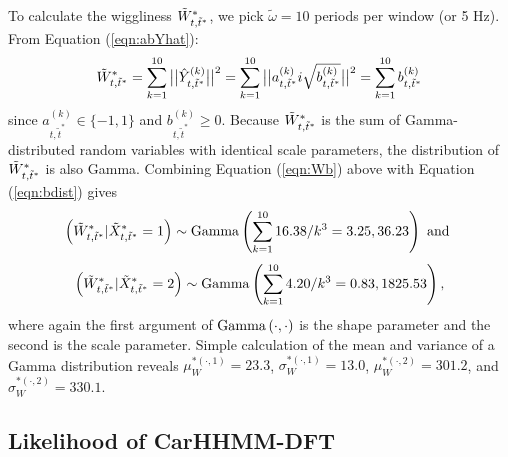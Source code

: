 To calculate the wiggliness $\tilde{W}^*_{t,\tilde t^*}$, we pick $\tilde{\omega} = 10$ periods per window (or 5 Hz). From Equation (\ref{eqn:abYhat}):
%
\begin{equation}
    \Ztwo_{t,\tilde t^*} = \sum_{k=1}^{10} \big|\big|\hat{Y}^{(k)}_{t,\tilde t^*}\big|\big|^2 = \sum_{k=1}^{10} \big|\big|a^{(k)}_{t,\tilde t^*}i\sqrt{b^{(k)}_{t,\tilde t^*}}\big|\big|^2 = \sum_{k=1}^{10} b^{(k)}_{t,\tilde t^*}
    \label{eqn:Wb}
\end{equation}
%
since $a^{(k)}_{t,\tilde t^*} \in \{-1,1\}$ and $b^{(k)}_{t,\tilde t^*} \geq 0$. Because $\tilde{W}^*_{t,\tilde t^*}$ is the sum of Gamma-distributed random variables with identical scale parameters, the distribution of $\tilde{W}^*_{t,\tilde t^*}$ is also Gamma. Combining Equation (\ref{eqn:Wb}) above with Equation (\ref{eqn:bdist}) gives
%
$$\left(\tilde{W}^*_{t,\tilde t^*}|\tilde X^*_{t,\tilde t^*} = 1\right) \sim {\rm{Gamma}}\left(\sum_{k=1}^{10} 16.38/k^3 = 3.25 , 36.23 \right) \text { and }$$
%
$$\left(\tilde{W}^*_{t,\tilde t^*}|\tilde X^*_{t,\tilde t^*} = 2\right) \sim {\rm{Gamma}}\left(\sum_{k=1}^{10} 4.20/k^3 = 0.83 , 1825.53 \right),$$
%
where again the first argument of ${\rm{Gamma}}\left(\cdot,\cdot\right)$ is the shape parameter and the second is the scale parameter. Simple calculation of the mean and variance of a Gamma distribution reveals $\mu_W^{*(\cdot,1)} = 23.3$, $\sigma_W^{*(\cdot,1)} = 13.0$, $\mu_W^{*(\cdot,2)} = 301.2$, and $\sigma_W^{*(\cdot,2)} = 330.1$.


\subsection{Likelihood of CarHHMM-DFT}

